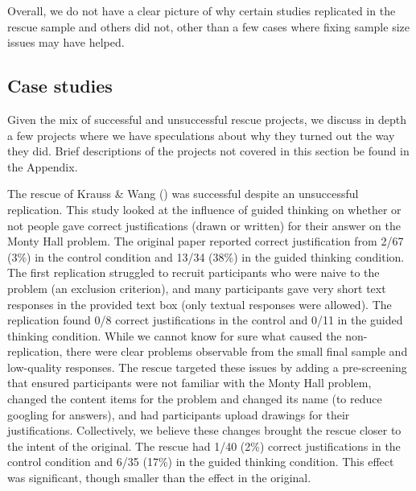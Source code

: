\documentclass[
  english,
  a4paper,
]{article}
\begin{document}
Overall, we do not have a clear picture of why certain studies replicated in the rescue sample and others did not, other than a few cases where fixing sample size issues may have helped.

\subsection{Case studies}\label{case-studies}

Given the mix of successful and unsuccessful rescue projects, we discuss in depth a few projects where we have speculations about why they turned out the way they did.
Brief descriptions of the projects not covered in this section be found in the Appendix.

The rescue of Krauss \& Wang () was successful despite an unsuccessful replication.
This study looked at the influence of guided thinking on whether or not people gave correct justifications (drawn or written) for their answer on the Monty Hall problem.
The original paper reported correct justification from 2/67 (3\%) in the control condition and 13/34 (38\%) in the guided thinking condition.
The first replication struggled to recruit participants who were naive to the problem (an exclusion criterion), and many participants gave very short text responses in the provided text box (only textual responses were allowed).
The replication found 0/8 correct justifications in the control and 0/11 in the guided thinking condition.
While we cannot know for sure what caused the non-replication, there were clear problems observable from the small final sample and low-quality responses.
The rescue targeted these issues by adding a pre-screening that ensured participants were not familiar with the Monty Hall problem, changed the content items for the problem and changed its name (to reduce googling for answers), and had participants upload drawings for their justifications.
Collectively, we believe these changes brought the rescue closer to the intent of the original.
The rescue had 1/40 (2\%) correct justifications in the control condition and 6/35 (17\%) in the guided thinking condition.
This effect was significant, though smaller than the effect in the original.
\end{document}
